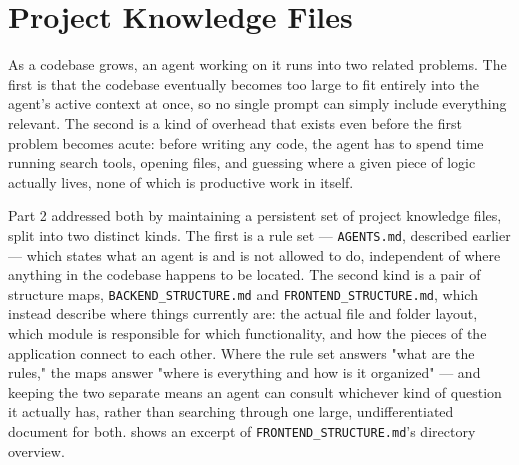 \section{Project Knowledge Files}

As a codebase grows, an agent working on it runs into two related problems. The first is that the codebase eventually becomes too large to fit entirely into the agent's active context at once, so no single prompt can simply include everything relevant. The second is a kind of overhead that exists even before the first problem becomes acute: before writing any code, the agent has to spend time running search tools, opening files, and guessing where a given piece of logic actually lives, none of which is productive work in itself.

Part 2 addressed both by maintaining a persistent set of project knowledge files, split into two distinct kinds. The first is a rule set --- \texttt{AGENTS.md}, described earlier --- which states what an agent is and is not allowed to do, independent of where anything in the codebase happens to be located. The second kind is a pair of structure maps, \texttt{BACKEND\_STRUCTURE.md} and \texttt{FRONTEND\_STRUCTURE.md}, which instead describe where things currently are: the actual file and folder layout, which module is responsible for which functionality, and how the pieces of the application connect to each other. Where the rule set answers "what are the rules," the maps answer "where is everything and how is it organized" --- and keeping the two separate means an agent can consult whichever kind of question it actually has, rather than searching through one large, undifferentiated document for both.  shows an excerpt of \texttt{FRONTEND\_STRUCTURE.md}'s directory overview.

